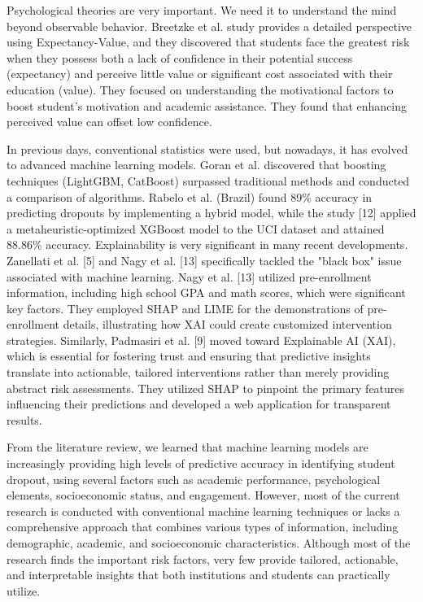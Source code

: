\documentclass[journal]{IEEEtran}
\begin{document}
Psychological theories are very important. We need it to understand the mind beyond observable behavior. Breetzke et al. \cite{breetzke2024expectancy} study provides a detailed perspective using Expectancy-Value, and they discovered that students face the greatest risk when they possess both a lack of confidence in their potential success (expectancy) and perceive little value or significant cost associated with their education (value). They focused on understanding the motivational factors to boost student’s motivation and academic assistance. They found that enhancing perceived value can offset low confidence.

In previous days, conventional statistics were used, but nowadays, it has evolved to advanced machine learning models. Goran et al. \cite{villar2024supervised} discovered that boosting techniques (LightGBM, CatBoost) surpassed traditional methods and conducted a comparison of algorithms. Rabelo et al. \cite{rabelo2025model} (Brazil) found 89\% accuracy in predicting dropouts by implementing a hybrid model, while the study [12] applied a metaheuristic-optimized XGBoost model to the UCI dataset and attained 88.86\% accuracy. Explainability is very significant in many recent developments. Zanellati et al. [5] and Nagy et al. [13] specifically tackled the "black box" issue associated with machine learning. Nagy et al. [13] utilized pre-enrollment information, including high school GPA and math scores, which were significant key factors. They employed SHAP and LIME for the demonstrations of pre-enrollment details, illustrating how XAI could create customized intervention strategies. Similarly, Padmasiri et al. [9] moved toward Explainable AI (XAI), which is essential for fostering trust and ensuring that predictive insights translate into actionable, tailored interventions rather than merely providing abstract risk assessments. They utilized SHAP to pinpoint the primary features influencing their predictions and developed a web application for transparent results.

From the literature review, we learned that machine learning models are increasingly providing high levels of predictive accuracy in identifying student dropout, using several factors such as academic performance, psychological elements, socioeconomic status, and engagement. However, most of the current research is conducted with conventional machine learning techniques or lacks a comprehensive approach that combines various types of information, including demographic, academic, and socioeconomic characteristics. Although most of the research finds the important risk factors, very few provide tailored, actionable, and 
interpretable insights that both institutions and students can practically utilize.
\end{document}
